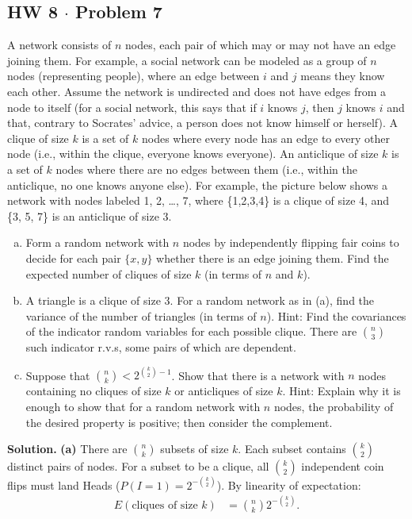 \documentclass[11pt,a4paper]{article}
\begin{document}
\vspace{10pt}
\subsection{HW 8 $\cdot$ Problem 7}
\begin{tcolorbox}[title={HW 8 $\cdot$ Problem 7}]
A network consists of $n$ nodes, each pair of which may or may not have an edge joining them. For example, a social network can be modeled as a group of $n$ nodes (representing people), where an edge between $i$ and $j$ means they know each other. Assume the network is undirected and does not have edges from a node to itself (for a social network, this says that if $i$ knows $j$, then $j$ knows $i$ and that, contrary to Socrates' advice, a person does not know himself or herself). A clique of size $k$ is a set of $k$ nodes where every node has an edge to every other node (i.e., within the clique, everyone knows everyone). An anticlique of size $k$ is a set of $k$ nodes where there are no edges between them (i.e., within the anticlique, no one knows anyone else). For example, the picture below shows a network with nodes labeled 1, 2, \dots, 7, where \{1,2,3,4\} is a clique of size 4, and \{3, 5, 7\} is an anticlique of size 3.
\begin{enumerate}[(a)]
\item Form a random network with $n$ nodes by independently flipping fair coins to decide for each pair $\{x, y\}$ whether there is an edge joining them. Find the expected number of cliques of size $k$ (in terms of $n$ and $k$).
\item A triangle is a clique of size 3. For a random network as in (a), find the variance of the number of triangles (in terms of $n$).
Hint: Find the covariances of the indicator random variables for each possible clique. There are $\binom{n}{3}$ such indicator r.v.s, some pairs of which are dependent.
\item Suppose that $\binom{n}{k} < 2^{\binom{k}{2} - 1}$. Show that there is a network with $n$ nodes containing no cliques of size $k$ or anticliques of size $k$.
Hint: Explain why it is enough to show that for a random network with $n$ nodes, the probability of the desired property is positive; then consider the complement.
\end{enumerate}
\end{tcolorbox}

\noindent \textbf{Solution.} \textbf{(a)} There are $\binom{n}{k}$ subsets of size $k$. Each subset contains $\binom{k}{2}$ distinct pairs of nodes. For a subset to be a clique, all $\binom{k}{2}$ independent coin flips must land Heads ($P(I = 1) = 2^{-\binom{k}{2}}$). By linearity of expectation:
\begin{align*}
E(\text{cliques of size } k) &= \binom{n}{k} 2^{-\binom{k}{2}}.
\end{align*}
\end{document}

